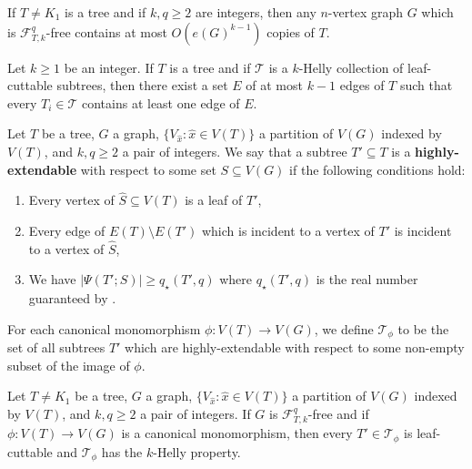 \documentclass[10pt,a4paper]{amsart}
\newcommand{\Pow}{{q_\star}} %
\newcommand{\pow}{q} %
\newcommand{\sm}{\setminus}
\newcommand{\sub}{\subseteq}
\renewcommand{\c}[1]{\mathcal{#1}}
\begin{document}
	\begin{theorem}\label{theorem:treeBoundEG}
		If $T\ne K_1$ is a tree and if $k,\pow\ge 2$ are integers, then any $n$-vertex graph $G$ which is $\c{F}_{T,k}^\pow$-free contains at most $O(e(G)^{k-1})$ copies of $T$. 
	\end{theorem}

	\begin{theorem}\label{thm:Helly}
		Let $k\geq 1$ be an integer. If $T$ is a tree and if $\c{T}$ is a $k$-Helly collection of leaf-cuttable subtrees, then there exist a set $E$ of at most $k-1$ edges of $T$ such that every $T_i\in \c{T}$ contains at least one edge of $E$.
	\end{theorem}

	\begin{definition}
		Let $T$ be a tree, $G$ a graph, $\{V_{\hat{x}}:\hat{x}\in V(T)\}$ a partition of $V(G)$ indexed by $V(T)$, and $k,\pow\ge 2$ a pair of integers.  We say that a subtree $T'\sub T$ is a \textbf{highly-extendable} with respect to some set $S\sub V(G)$ if the following conditions hold:
		\begin{enumerate}[label=(\alph*)]
			\item Every vertex of $\widehat{S}\sub V(T)$ is a leaf of $T'$,\label{condition highly extendable definition (a) leaf of T'}
			\item Every edge of $E(T)\sm E(T')$ which is incident to a vertex of $T'$ is incident to a vertex of $\widehat{S}$, \label{condition highly extendable defintion (b) edges incident}
			\item We have $|\Psi(T';S)|\geq \Pow(T',q)$ where $\Pow(T',q)$ is the real number guaranteed by .\label{condition highly extendable definition (c) many canonical morphisms}
		\end{enumerate}
		For each canonical monomorphism $\phi:V(T)\to V(G)$, we define $\c{T}_\phi$ to be the set of all subtrees $T'$ which are highly-extendable with respect to some non-empty subset of the image of $\phi$.
	\end{definition}

	\begin{proposition}\label{proposition:HellyTechnical}
		Let $T\ne K_1$ be a tree, $G$ a graph, $\{V_{\hat{x}}:\hat{x}\in V(T)\}$ a partition of $V(G)$ indexed by $V(T)$, and $k,\pow \ge 2$ a pair of integers.  If $G$ is $\c{F}_{T,k}^\pow$-free and if $\phi:V(T)\to V(G)$ is a canonical monomorphism, then every $T'\in \c{T}_\phi$ is leaf-cuttable and $\c{T}_\phi$ has the $k$-Helly property.
	\end{proposition}
\end{document}
